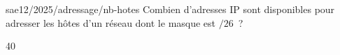 \begin{question}{sae12/2025/adressage/nb-hotes}
  Combien d'adresses IP sont disponibles pour adresser les hôtes d'un
  réseau dont le masque est $/26$~?
  \begin{reponses}{4}{0}
  \end{reponses}
\end{question}
